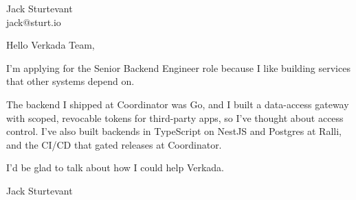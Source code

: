 \documentclass[11pt]{article}
\begin{document}
\raggedright

{\namefont\fontsize{20pt}{24pt}\selectfont Jack Sturtevant}\\[-0.3em]
jack@sturt.io

\vspace{1.2em}

Hello Verkada Team,

I'm applying for the Senior Backend Engineer role because I like building services that other systems depend on.

The backend I shipped at Coordinator was Go, and I built a data-access gateway with scoped, revocable tokens for third-party apps, so I've thought about access control. I've also built backends in TypeScript on NestJS and Postgres at Ralli, and the CI/CD that gated releases at Coordinator.

I'd be glad to talk about how I could help Verkada.

\vspace{0.6em}
Jack Sturtevant
\end{document}
